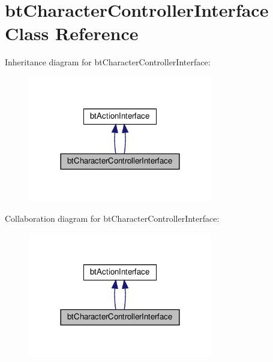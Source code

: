 \hypertarget{classbtCharacterControllerInterface}{}\section{bt\+Character\+Controller\+Interface Class Reference}
\label{classbtCharacterControllerInterface}


Inheritance diagram for bt\+Character\+Controller\+Interface\+:
\nopagebreak
\begin{figure}[H]
\begin{center}
\leavevmode
\includegraphics[width=228pt]{classbtCharacterControllerInterface__inherit__graph}
\end{center}
\end{figure}


Collaboration diagram for bt\+Character\+Controller\+Interface\+:
\nopagebreak
\begin{figure}[H]
\begin{center}
\leavevmode
\includegraphics[width=228pt]{classbtCharacterControllerInterface__coll__graph}
\end{center}
\end{figure}
